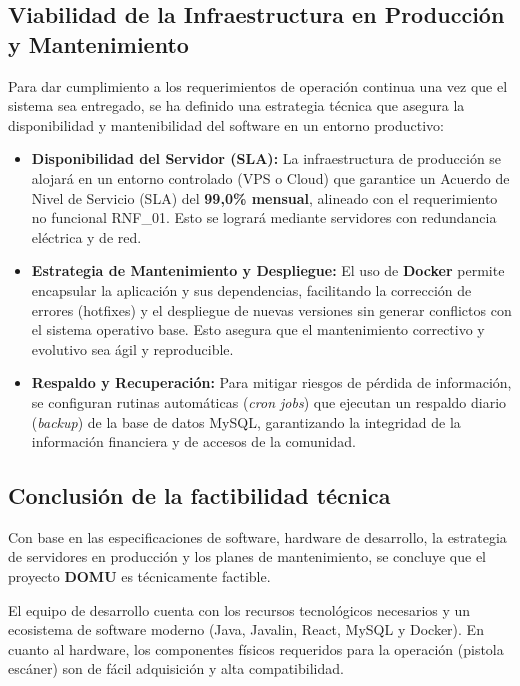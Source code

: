 \subsection{Viabilidad de la Infraestructura en Producción y Mantenimiento}

Para dar cumplimiento a los requerimientos de operación continua una vez que el sistema sea entregado, se ha definido una estrategia técnica que asegura la disponibilidad y mantenibilidad del software en un entorno productivo:

\begin{itemize}
    \item \textbf{Disponibilidad del Servidor (SLA):} La infraestructura de producción se alojará en un entorno controlado (VPS o Cloud) que garantice un Acuerdo de Nivel de Servicio (SLA) del \textbf{99,0\% mensual}, alineado con el requerimiento no funcional RNF\_01. Esto se logrará mediante servidores con redundancia eléctrica y de red.
    
    \item \textbf{Estrategia de Mantenimiento y Despliegue:} El uso de \textbf{Docker} permite encapsular la aplicación y sus dependencias, facilitando la corrección de errores (hotfixes) y el despliegue de nuevas versiones sin generar conflictos con el sistema operativo base. Esto asegura que el mantenimiento correctivo y evolutivo sea ágil y reproducible.
    
    \item \textbf{Respaldo y Recuperación:} Para mitigar riesgos de pérdida de información, se configuran rutinas automáticas (\textit{cron jobs}) que ejecutan un respaldo diario (\textit{backup}) de la base de datos MySQL, garantizando la integridad de la información financiera y de accesos de la comunidad.
\end{itemize}

\subsection*{Conclusión de la factibilidad técnica}
Con base en las especificaciones de software, hardware de desarrollo, la estrategia de servidores en producción y los planes de mantenimiento, se concluye que el proyecto \textbf{DOMU} es técnicamente factible.

El equipo de desarrollo cuenta con los recursos tecnológicos necesarios y un ecosistema de software moderno (Java, Javalin, React, MySQL y Docker). En cuanto al hardware, los componentes físicos requeridos para la operación (pistola escáner) son de fácil adquisición y alta compatibilidad.

